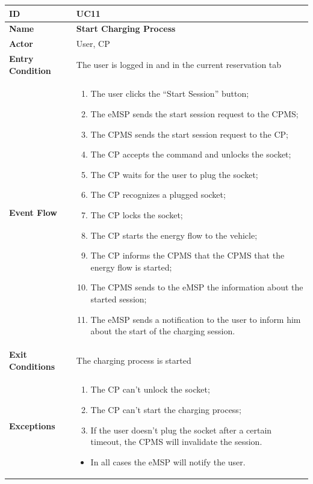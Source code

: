 \documentclass{Configuration_Files/PoliMi3i_thesis}
\begin{document}

\begin{table}[H]
    \begin{xltabular}{\textwidth}{| >{}l | X |}
    \hline
    \textbf{ID} & \textbf{UC11}\T\B\\
    \hline
    \textbf{Name} & \textbf{Start Charging Process}\T\B\\
    \hline \hline
    \textbf{Actor} & User, CP\T\B \\
    \hline
    \textbf{Entry Condition} & The user is logged in and in the current reservation tab\T\B\\
    \hline
    \textbf{Event Flow} & 
        \begin{enumerate}
        \item The user clicks the “Start Session” button;
        \item The eMSP sends the start session request to the CPMS;
        \item The CPMS sends the start session request to the CP;
        \item The CP accepts the command and unlocks the socket;
        \item The CP waits for the user to plug the socket;
        \item The CP recognizes a plugged socket;
        \item The CP locks the socket;
        \item The CP starts the energy flow to the vehicle;
        \item The CP informs the CPMS that the CPMS that the energy flow is started;
        \item The CPMS sends to the eMSP the information about the started session;
        \item The eMSP sends a notification to the user to inform him about the start of the charging session.
        \end{enumerate}\B\\
    \hline
    \textbf{Exit Conditions} & The charging process is started\B\\
    \hline
    \textbf{Exceptions} & 
    \begin{enumerate}
        \item The CP can’t unlock the socket;
        \item The CP can’t start the charging process;
        \item If the user doesn't plug the socket after a certain timeout, the CPMS will invalidate the session.
    \end{enumerate}
    \begin{itemize}
        \item In all cases the eMSP will notify the user.
    \end{itemize}\B\\
    \hline
    \end{xltabular}
\end{table}
\end{document}
